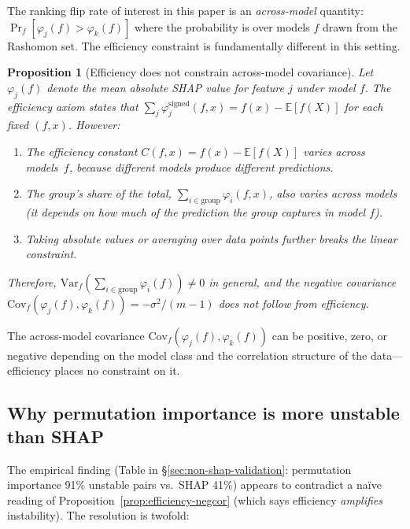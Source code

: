 \documentclass{article}
\newtheorem{proposition}[theorem]{Proposition}
\begin{document}
The ranking flip rate of interest in this paper is an
\emph{across-model} quantity: $\Pr_f[\varphi_j(f) > \varphi_k(f)]$
where the probability is over models $f$ drawn from the Rashomon set.
The efficiency constraint is fundamentally different in this setting.

\begin{proposition}[Efficiency does not constrain across-model covariance]
\label{prop:no-across-model}
Let $\varphi_j(f)$ denote the mean absolute SHAP value for feature $j$
under model $f$.  The efficiency axiom states that
$\sum_j \varphi_j^{\mathrm{signed}}(f,x) = f(x) - \mathbb{E}[f(X)]$
for each fixed $(f,x)$.  However:
\begin{enumerate}
\item The efficiency constant $C(f,x) = f(x) - \mathbb{E}[f(X)]$
  \emph{varies across models}~$f$, because different models produce
  different predictions.
\item The group's share of the total,
  $\sum_{i \in \text{group}} \varphi_i(f,x)$, also varies across
  models (it depends on how much of the prediction the group captures
  in model $f$).
\item Taking absolute values or averaging over data points further
  breaks the linear constraint.
\end{enumerate}
Therefore, $\mathrm{Var}_f(\sum_{i \in \text{group}} \varphi_i(f))
\neq 0$ in general, and the negative covariance
$\mathrm{Cov}_f(\varphi_j(f), \varphi_k(f)) = -\sigma^2/(m-1)$
does \emph{not} follow from efficiency.
\end{proposition}

The across-model covariance $\mathrm{Cov}_f(\varphi_j(f),
\varphi_k(f))$ can be positive, zero, or negative depending on the
model class and the correlation structure of the data---efficiency
places no constraint on it.

\subsection{Why permutation importance is more unstable than SHAP}

The empirical finding (Table in \S\ref{sec:non-shap-validation}:
permutation importance 91\% unstable pairs vs.\ SHAP 41\%) appears to
contradict a na\"ive reading of Proposition~\ref{prop:efficiency-negcor}
(which says efficiency \emph{amplifies} instability).  The resolution
is twofold:
\end{document}
